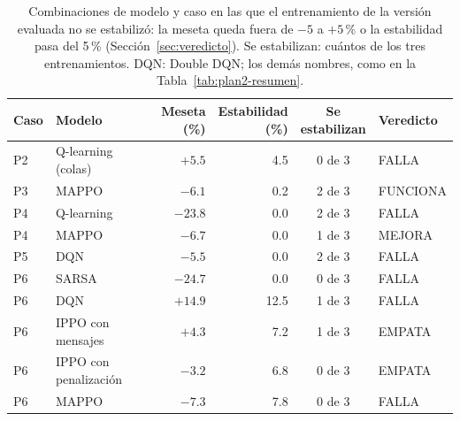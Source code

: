 \begin{table}[H]
\centering
\footnotesize
\setlength{\tabcolsep}{5pt}
\begin{tabular}{llrrcl}
\toprule
Caso & Modelo & \makecell{Meseta\\(\%)} & \makecell{Estabilidad\\(\%)} & \makecell{Se\\estabilizan} & Veredicto \\
\midrule
P2 & Q-learning (colas) & $+5.5$ & 4.5 & 0 de 3 & FALLA \\
P3 & MAPPO & $-6.1$ & 0.2 & 2 de 3 & FUNCIONA \\
P4 & Q-learning & $-23.8$ & 0.0 & 2 de 3 & FALLA \\
P4 & MAPPO & $-6.7$ & 0.0 & 1 de 3 & MEJORA \\
P5 & DQN & $-5.5$ & 0.0 & 2 de 3 & FALLA \\
P6 & SARSA & $-24.7$ & 0.0 & 0 de 3 & FALLA \\
P6 & DQN & $+14.9$ & 12.5 & 1 de 3 & FALLA \\
P6 & IPPO con mensajes & $+4.3$ & 7.2 & 1 de 3 & EMPATA \\
P6 & IPPO con penalización & $-3.2$ & 6.8 & 0 de 3 & EMPATA \\
P6 & MAPPO & $-7.3$ & 7.8 & 0 de 3 & FALLA \\
\bottomrule
\end{tabular}
\caption[Combinaciones con el entrenamiento sin estabilizar]{Combinaciones de modelo y caso en las que el entrenamiento de la versión evaluada no se estabilizó: la meseta queda fuera de $-5$ a $+5$\,\% o la estabilidad pasa del 5\,\% (Sección~\ref{sec:veredicto}). Se estabilizan: cuántos de los tres entrenamientos. DQN: Double DQN; los demás nombres, como en la Tabla~\ref{tab:plan2-resumen}.}
\label{tab:plan2-pendientes}
\end{table}

